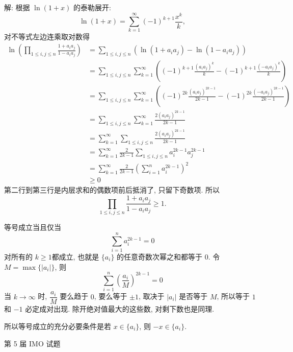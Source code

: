 解: 根据 $\ln(1+x)$ 的泰勒展开:
\[\ln(1+x) = \sum_{k=1}^\infty (-1)^{k+1}\frac{x^k}{k} ,\]
对不等式左边连乘取对数得
\begin{align*}
\ln\left(\prod_{1\le i,j\le n}\frac{1+a_ia_j}{1-a_ia_j}\right) &= \sum_{1\le i,j\le n}\left(\ln(1+a_ia_j) - \ln(1-a_ia_j)\right)\\
&= \sum_{1\le i,j\le n} \sum_{k=1}^\infty\left( (-1)^{k+1}\frac{(a_ia_j)^k}{k} -  (-1)^{k+1}\frac{(-a_ia_j)^k}{k} \right) \\
&=  \sum_{1\le i,j\le n} \sum_{k=1}^\infty\left( (-1)^{2k}\frac{(a_ia_j)^{2k-1}}{2k-1} -  (-1)^{2k}\frac{(-a_ia_j)^{2k-1}}{2k-1} \right)\\
&= \sum_{1\le i,j\le n} \sum_{k=1}^\infty \frac{2(a_ia_j)^{2k-1}}{2k-1}\\
&= \sum_{k=1}^\infty\sum_{1\le i,j\le n} \frac{2(a_ia_j)^{2k-1}}{2k-1}\\
&= \sum_{k=1}^\infty\frac{2}{2k-1}\sum_{1\le i,j\le n}a_i^{2k-1}a_j^{2k-1}\\
&= \sum_{k=1}^\infty\frac{2}{2k-1}\left(\sum_{i = 1}^n a_i^{2k-1}\right)^2 \\
&\ge 0
\end{align*}
第二行到第三行是内层求和的偶数项前后抵消了, 只留下奇数项. 所以
\[\prod_{1\le i,j\le n}\frac{1+a_ia_j}{1-a_ia_j} \ge 1 .\]

等号成立当且仅当
\[\sum_{i = 1}^n a_i^{2k-1} = 0\]
对所有的 $k \ge 1$都成立, 也就是 $\{a_i\}$ 的任意奇数次幂之和都等于 $0$. 令 $M = \max\{ |a_i| \}$, 则
\[\sum_{i=1}^n\left(\frac{a_i}{M}\right)^{2k-1} = 0\]
当 $k\to\infty$ 时, $\dfrac{a_i}{M}$ 要么趋于 $0$, 要么等于 $\pm 1$, 取决于 $|a_i|$ 是否等于 $M$, 所以等于 $1$ 和 $-1$ 必定成对出现. 除开绝对值最大的这些数, 对剩下数也是同理. 

所以等号成立的充分必要条件是若 $x\in\{a_i\}$, 则 $-x\in\{a_i\}$.

\newpage

\noindent 第 5 届 IMO 试题

